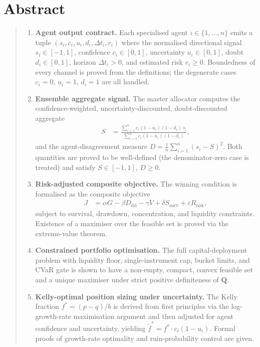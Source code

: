 \documentclass[12pt,openany]{book}
\newcommand{\bfQ}{\mathbf{Q}}
\numberwithin{equation}{chapter}
\theoremstyle{plain}
\theoremstyle{definition}
\theoremstyle{remark}
\newenvironment{abstract}{%
  \chapter*{Abstract}
  \begin{quote}\small
}{%
  \end{quote}
}
\numberwithin{equation}{chapter}
\theoremstyle{plain}
\begin{document}
\begin{abstract}
\begin{enumerate}[label=\textbf{\arabic*.}, leftmargin=2em,
                  itemsep=4pt, parsep=0pt, topsep=4pt]
  \item \textbf{Agent output contract.}\enspace
        Each specialised agent $i \in \{1,\ldots,n\}$ emits a
        tuple $(s_i, c_i, u_i, d_i, \Delta t_i, r_i)$ where the
        normalised directional signal $s_i \in [-1,1]$, confidence
        $c_i \in [0,1]$, uncertainty $u_i \in [0,1]$, doubt
        $d_i \in [0,1]$, horizon $\Delta t_i > 0$, and estimated
        risk $r_i \ge 0$.  Boundedness of every channel is proved
        from the definitions; the degenerate cases
        $c_i = 0$, $u_i = 1$, $d_i = 1$ are all handled.

  \item \textbf{Ensemble aggregate signal.}\enspace
        The master allocator computes the confidence-weighted,
        uncertainty-discounted, doubt-discounted aggregate
        \begin{align*}
          S &= \frac{\sum_{i=1}^{n} c_i(1-u_i)(1-d_i)\,s_i}
                    {\sum_{i=1}^{n} c_i(1-u_i)(1-d_i)},
        \end{align*}
        and the agent-disagreement measure
        $D = \tfrac{1}{n}\sum_{i=1}^{n}(s_i - S)^2$.
        Both quantities are proved to be well-defined (the
        denominator-zero case is treated) and satisfy
        $S \in [-1,1]$, $D \ge 0$.

  \item \textbf{Risk-adjusted composite objective.}\enspace
        The winning condition is formalised as the composite
        objective
        \begin{align*}
          J &= \alpha G - \beta D_{\mathrm{dd}}
              - \gamma V
              + \delta S_{\mathrm{surv}}
              + \varepsilon R_{\mathrm{risk}},
        \end{align*}
        subject to survival, drawdown, concentration, and liquidity
        constraints.  Existence of a maximiser over the feasible
        set is proved via the extreme-value theorem.

  \item \textbf{Constrained portfolio optimisation.}\enspace
        The full capital-deployment problem with liquidity floor,
        single-instrument cap, bucket limits, and CVaR gate is
        shown to have a non-empty, compact, convex feasible set
        and a unique maximiser under strict positive definiteness
        of $\bfQ$.

  \item \textbf{Kelly-optimal position sizing under uncertainty.}\enspace
        The Kelly fraction $f^* = (p - q)/b$ is derived from first
        principles via the log-growth-rate maximisation argument
        and then adjusted for agent confidence and uncertainty,
        yielding $\tilde{f}^* = f^* \cdot c_i (1 - u_i)$.
        Formal proofs of growth-rate optimality and
        ruin-probability control are given.


\end{enumerate}
\end{abstract}
\end{document}
